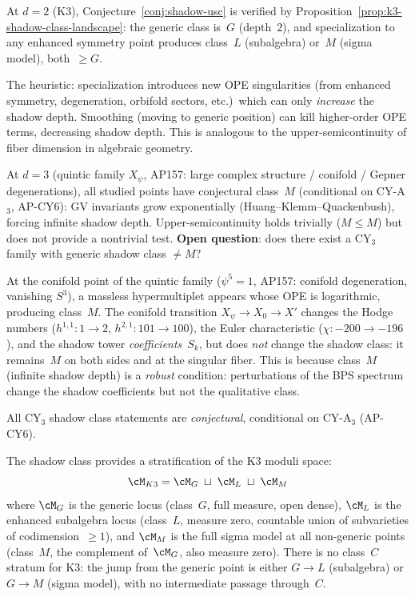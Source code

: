 \begin{remark}
\label{rem:shadow-usc-evidence}
At $d = 2$ (K3), Conjecture~\ref{conj:shadow-usc} is verified by
Proposition~\ref{prop:k3-shadow-class-landscape}: the generic class
is~$G$ (depth~$2$), and specialization to any enhanced symmetry point
produces class~$L$ (subalgebra) or~$M$ (sigma model), both~$\geq G$.

The heuristic: specialization introduces new OPE singularities (from
enhanced symmetry, degeneration, orbifold sectors, etc.)\ which can
only \emph{increase} the shadow depth.  Smoothing (moving to generic
position) can kill higher-order OPE terms, decreasing shadow depth.
This is analogous to the upper-semicontinuity of fiber dimension
in algebraic geometry.

At $d = 3$ (quintic family $X_\psi$, AP157: large complex structure /
conifold / Gepner degenerations), all studied points have conjectural
class~$M$ (conditional on CY-A$_3$, AP-CY6): GV invariants grow
exponentially (Huang--Klemm--Quackenbush), forcing infinite shadow
depth.  Upper-semicontinuity holds trivially ($M \leq M$) but does
not provide a nontrivial test.  \textbf{Open question}: does there
exist a CY$_3$ family with generic shadow class $\neq M$?
\end{remark}

\begin{remark}
\label{rem:conifold-shadow-class}
At the conifold point of the quintic family ($\psi^5 = 1$,
AP157: conifold degeneration, vanishing $S^3$), a massless
hypermultiplet appears whose OPE is logarithmic, producing class~$M$.
The conifold transition $X_\psi \to X_0 \to X'$ changes the Hodge
numbers ($h^{1,1}: 1 \to 2$, $h^{2,1}: 101 \to 100$), the Euler
characteristic ($\chi: {-}200 \to {-}196$), and the shadow tower
\emph{coefficients}~$S_k$, but does \emph{not} change the shadow
class: it remains~$M$ on both sides and at the singular fiber.
This is because class~$M$ (infinite shadow depth) is a
\emph{robust} condition: perturbations of the BPS spectrum
change the shadow coefficients but not the qualitative
class.

All CY$_3$ shadow class statements are \emph{conjectural},
conditional on CY-A$_3$ (AP-CY6).
\end{remark}

\begin{remark}
\label{rem:k3-moduli-stratification}
The shadow class provides a stratification of the K3 moduli space:
\[
 \cM_{K3} = \cM_G \;\sqcup\; \cM_L \;\sqcup\; \cM_M
\]
where $\cM_G$ is the generic locus (class~$G$, full measure, open dense),
$\cM_L$ is the enhanced subalgebra locus (class~$L$, measure zero,
countable union of subvarieties of codimension~$\geq 1$), and
$\cM_M$ is the full sigma model at all non-generic points
(class~$M$, the complement of~$\cM_G$, also measure zero).
There is no class~$C$ stratum for K3: the jump from the generic
point is either $G \to L$ (subalgebra) or $G \to M$ (sigma model),
with no intermediate passage through~$C$.
\end{remark}


